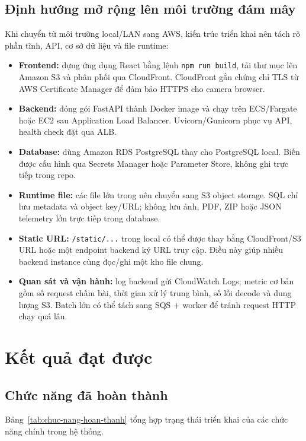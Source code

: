 \subsection{Định hướng mở rộng lên môi trường đám mây}

Khi chuyển từ môi trường local/LAN sang AWS, kiến trúc triển khai nên tách rõ phần tĩnh, API, cơ sở dữ liệu và file runtime:

\begin{itemize}
    \item \textbf{Frontend:} dựng ứng dụng React bằng lệnh \texttt{npm run build}, tải thư mục  lên Amazon S3 và phân phối qua CloudFront. CloudFront gắn chứng chỉ TLS từ AWS Certificate Manager để đảm bảo HTTPS cho camera browser.
    \item \textbf{Backend:} đóng gói FastAPI thành Docker image và chạy trên ECS/Fargate hoặc EC2 sau Application Load Balancer. Uvicorn/Gunicorn phục vụ API, health check đặt qua ALB.
    \item \textbf{Database:} dùng Amazon RDS PostgreSQL thay cho PostgreSQL local. Biến  được cấu hình qua Secrets Manager hoặc Parameter Store, không ghi trực tiếp trong repo.
    \item \textbf{Runtime file:} các file lớn trong  nên chuyển sang S3 object storage. SQL chỉ lưu metadata và object key/URL; không lưu ảnh, PDF, ZIP hoặc JSON telemetry lớn trực tiếp trong database.
    \item \textbf{Static URL:} \texttt{/static/...} trong local có thể được thay bằng CloudFront/S3 URL hoặc một endpoint backend ký URL truy cập. Điều này giúp nhiều backend instance cùng đọc/ghi một kho file chung.
    \item \textbf{Quan sát và vận hành:} log backend gửi CloudWatch Logs; metric cơ bản gồm số request chấm bài, thời gian xử lý trung bình, số lỗi decode và dung lượng S3. Batch lớn có thể tách sang SQS + worker để tránh request HTTP chạy quá lâu.
\end{itemize}

\section{Kết quả đạt được}

\subsection{Chức năng đã hoàn thành}

Bảng~\ref{tab:chuc-nang-hoan-thanh} tổng hợp trạng thái triển khai của các chức năng chính trong hệ thống.

